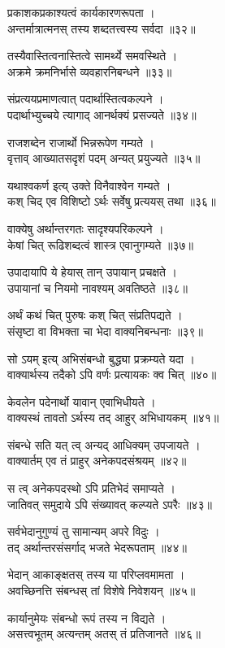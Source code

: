 प्रकाशकप्रकाश्यत्वं कार्यकारणरूपता ।\\अन्तर्मात्रात्मनस् तस्य शब्दतत्त्वस्य सर्वदा ॥३२॥

तस्यैवास्तित्वनास्तित्वे सामर्थ्ये समवस्थिते ।\\अक्रमे क्रमनिर्भासे व्यवहारनिबन्धने ॥३३॥

संप्रत्ययप्रमाणत्वात् पदार्थास्तित्वकल्पने ।\\पदार्थाभ्युच्चये त्यागाद् आनर्थक्यं प्रसज्यते ॥३४॥

राजशब्देन राजार्थो भिन्नरूपेण गम्यते ।\\वृत्ताव् आख्यातसदृशं पदम् अन्यत् प्रयुज्यते ॥३५॥

यथाश्वकर्ण इत्य् उक्ते विनैवाश्वेन गम्यते ।\\कश् चिद् एव विशिष्टो ऽर्थः सर्वेषु प्रत्ययस् तथा ॥३६॥

वाक्येषु अर्थान्तरगतः सादृश्यपरिकल्पने ।\\केषां चित् रूढिशब्दत्वं शास्त्र एवानुगम्यते ॥३७॥

उपादायापि ये हेयास् तान् उपायान् प्रचक्षते ।\\उपायानां च नियमो नावश्यम् अवतिष्ठते ॥३८॥

अर्थं कथं चित् पुरुषः कश् चित् संप्रतिपद्यते ।\\संसृष्टा वा विभक्ता चा भेदा वाक्यनिबन्धनाः ॥३९॥

सो ऽयम् इत्य् अभिसंबन्धो बुद्ध्या प्रक्रम्यते यदा ।\\वाक्यार्थस्य तदैको ऽपि वर्णः प्रत्यायकः क्व चित् ॥४०॥

केवलेन पदेनार्थो यावान् एवाभिधीयते ।\\वाक्यस्थं तावतो ऽर्थस्य तद् आहुर् अभिधायकम् ॥४१॥

संबन्धे सति यत् त्व् अन्यद् आधिक्यम् उपजायते ।\\वाक्यार्तम् एव तं प्राहुर् अनेकपदसंश्रयम् ॥४२॥

स त्व् अनेकपदस्थो ऽपि प्रतिभेदं समाप्यते ।\\जातिवत् समुदाये ऽपि संख्यावत् कल्प्यते ऽपरैः ॥४३॥

सर्वभेदानुगुण्यं तु सामान्यम् अपरे विदुः ।\\तद् अर्थान्तरसंसर्गाद् भजते भेदरूपताम् ॥४४॥

भेदान् आकाङ्क्षतस् तस्य या परिप्लवमामता ।\\अवच्छिनत्ति संबन्धस् तां विशेषे निवेशयन् ॥४५॥

कार्यानुमेयः संबन्धो रूपं तस्य न विद्यते ।\\असत्त्वभूतम् अत्यन्तम् अतस् तं प्रतिजानते ॥४६॥

